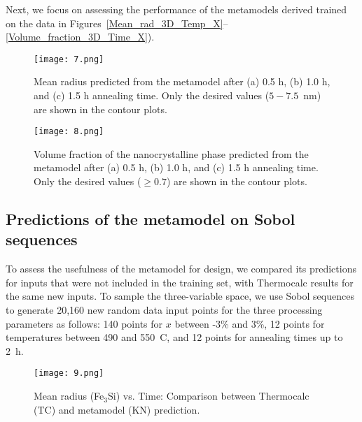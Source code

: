 Next, we focus on assessing the performance of the metamodels derived trained on the data in Figures~\ref{Mean_rad_3D_Temp_X}--\ref{Volume_fraction_3D_Time_X}).
\begin{figure}[ht]
\centering
\texttt{[image: 7.png]}
\caption{Mean radius predicted from the metamodel after (a) 0.5 h, (b) 1.0 h, and (c) 1.5 h annealing time. Only the desired values ($5-7.5$~nm) are shown in the
contour plots.\cite{CITRINE}}
\label{Mean_radius_meta}
\end{figure}



\begin{figure}[ht]
\centering
\texttt{[image: 8.png]}
\caption{Volume fraction of the nanocrystalline phase predicted from the metamodel after (a) 0.5 h, (b) 1.0 h, and (c) 1.5 h annealing time.
Only the desired values ($\geq 0.7$) are shown in the contour plots.\cite{CITRINE} }
\label{Volume_fraction_meta}
\end{figure}



\subsection{Predictions of the metamodel on Sobol sequences}

To assess the usefulness of the metamodel for design, we compared its predictions
for inputs that were not included in the training set, with Thermocalc results for the same new inputs.
To sample the three-variable space, we use Sobol sequences\cite{SOBOL196786} to generate 20,160 new random
data input points for the three processing parameters as follows: 140 points for $x$ between -3\% and 3\%,
12 points for temperatures between 490 and 550~\degree C, and 12 points for annealing times up to 2~h.


\begin{figure}[ht]
\centering
\texttt{[image: 9.png]}
\caption{Mean radius (Fe$_3$Si) vs. Time: Comparison between Thermocalc (TC) and metamodel (KN) prediction.\cite{CITRINE}}
\label{Comparison_TC_KNN_Mean_rad_Time}
\end{figure}

